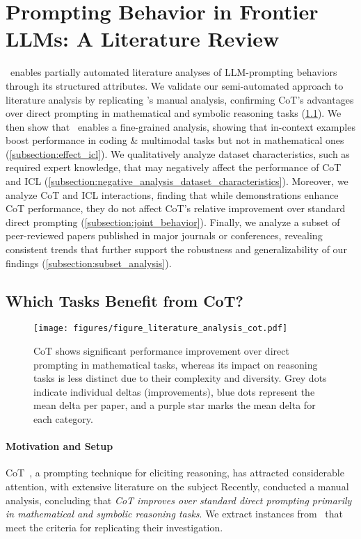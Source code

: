 \section{Prompting Behavior in Frontier LLMs: A Literature Review}
\label{section:literature_analysis_prompting_behavior}


\datasetname~enables partially automated literature analyses of LLM-prompting behaviors through its structured attributes.
We validate our semi-automated approach to literature analysis by replicating \citet{sprague2024cot}'s manual analysis, confirming CoT's advantages over direct prompting in mathematical and symbolic reasoning tasks (\cref{subsection:effect_cot}). 
We then show that \datasetname~enables a fine-grained analysis, showing that in-context examples boost performance in coding \& multimodal tasks but not in mathematical ones (\cref{subsection:effect_icl}). 
We qualitatively analyze dataset characteristics, such as required expert knowledge, that may negatively affect the performance of CoT and ICL (\cref{subsection:negative_analysis_dataset_characteristics}).
Moreover, we analyze CoT and ICL interactions, finding that while demonstrations enhance CoT performance, they do not affect CoT's relative improvement over standard direct prompting (\cref{subsection:joint_behavior}).
Finally, we analyze a subset of peer-reviewed papers published in major journals or conferences, revealing consistent trends that further support the robustness and generalizability of our findings (\cref{subsection:subset_analysis}).



\subsection{Which Tasks Benefit from CoT?}
\label{subsection:effect_cot}


\begin{figure}[t!]
    \centering  
    \texttt{[image: figures/figure\_literature\_analysis\_cot.pdf]}
    \caption{CoT shows significant performance improvement over direct prompting in mathematical tasks, whereas its impact on reasoning tasks is less distinct due to their complexity and diversity.
    Grey dots indicate individual deltas (improvements), blue dots represent the mean delta per paper, and a purple star marks the mean delta for each category.}
    \label{fig:cot_analysis_our_category}
\end{figure}


\paragraph{Motivation and Setup} 
CoT~\citep{wei2022chain}, a prompting technique for eliciting reasoning, has attracted considerable attention, with extensive literature on the subject \citep{wang2023towards, yao2024tree}
Recently, \citet{sprague2024cot} conducted a manual analysis, concluding that \textit{CoT improves over standard direct prompting primarily in mathematical and symbolic reasoning tasks}.  
We extract instances from \datasetname~that meet the criteria for replicating their investigation. 


